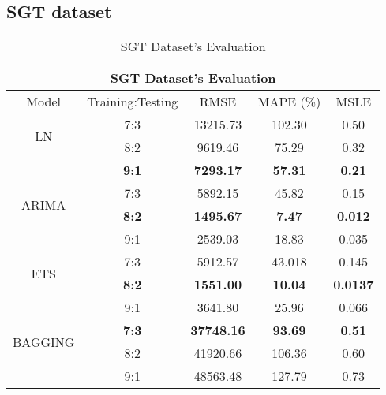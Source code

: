 \documentclass{ieeeojies}
\begin{document}
\subsection{SGT dataset} 
\begin{table}[H]
    \centering
    \begin{tabular}{|c|c|c|c|c|}
         \hline
         \multicolumn{5}{|c|}{\textbf{SGT Dataset's Evaluation}}\\
         \hline
         \centering Model & Training:Testing & RMSE & MAPE (\%) & MSLE\\
         \hline
         \multirow{2}{*}{LN} & 7:3 & 13215.73 & 102.30 & 0.50 \\ & 8:2 & 9619.46 & 75.29 & 0.32 \\ & \textbf{9:1} & \textbf{7293.17} & \textbf{57.31} & \textbf{0.21}\\
         \hline
         \multirow{2}{*}{ARIMA} & 7:3 &  5892.15 &  45.82 &0.15 \\ & \textbf{8:2} &  \textbf{1495.67} & \textbf{7.47} & \textbf{0.012} \\ & 9:1 & 2539.03 & 18.83 & 0.035\\
         \hline
         \multirow{2}{*}{ETS} & 7:3 & 5912.57 & 43.018 & 0.145 \\ & \textbf{8:2}  & \textbf{1551.00} &\textbf{10.04} &  \textbf{0.0137} \\ & 9:1 &  	3641.80 &	25.96 & 	0.066 \\
         \hline
          \multirow{2}{*}{BAGGING} & \textbf{7:3} & \textbf{37748.16} & \textbf{93.69} & \textbf{0.51} \\ & 8:2  &   41920.66 &106.36 & 0.60 \\ & 9:1 &  	48563.48 & 127.79 & 0.73 \\
         \hline
    \end{tabular}
    \caption{SGT Dataset's Evaluation}
    \label{vcbresult}
\end{table}
\end{document}
